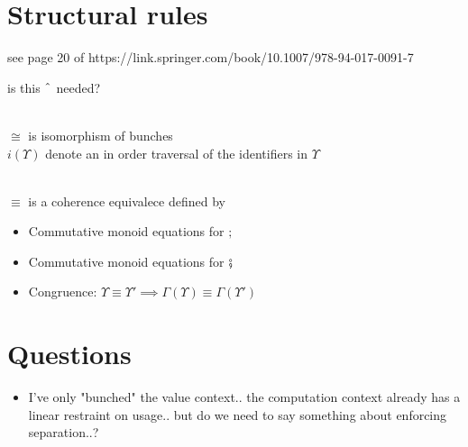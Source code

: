 \documentclass{article}
\begin{document}
\section{Structural rules}
see page 20 of  https://link.springer.com/book/10.1007/978-94-017-0091-7

\begin{prooftree}
\end{prooftree}
is this $\string^$ needed?

\begin{prooftree}
\end{prooftree}



\begin{prooftree}
\end{prooftree}
\\
$\cong$ is isomorphism of bunches
\\
$i(\Upsilon)$ denote an in order traversal of the identifiers in $\Upsilon$
    
\begin{prooftree}
\end{prooftree}
\\
$\equiv$ is a coherence equivalece defined by 
\begin{itemize}
    \item Commutative monoid equations for $;$
    \item Commutative monoid equations for $\fatsemi$
    \item Congruence: $\Upsilon \equiv \Upsilon' \implies \Gamma(\Upsilon) \equiv \Gamma(\Upsilon')$
\end{itemize}

\section{Questions}
\begin{itemize}
    \item I've only "bunched" the value context.. the computation context already has a linear restraint on usage.. but do we need to say something about enforcing separation..?
\end{itemize}


\end{document}

